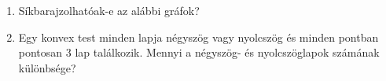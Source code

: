 \documentclass[a4paper, 12pt]{article}
\begin{document}
        \noindent{}
        \noindent{}
        
        
        \begin{enumerate}
            \item Síkbarajzolhatóak-e az alábbi gráfok?
            \begin{figure}[!ht]
                \centering
                
                
                
                
                
                
            \end{figure}
            \item Egy konvex test minden lapja négyszög vagy nyolcszög és minden pontban pontosan $3$ lap találkozik. Mennyi a négyszög- és nyolcszöglapok számának különbsége?

\end{enumerate}
\end{document}

